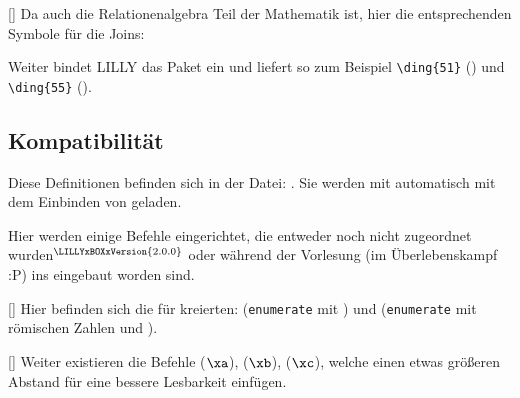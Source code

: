 [\cmdlist {}\cmdlist {}\cmdlist {}]
Da auch die Relationenalgebra Teil der Mathematik ist, hier die entsprechenden Symbole für die Joins:
%
%
%
\begin{bemerkung}
    Weiter bindet LILLY das  Paket ein und liefert so zum Beispiel \verb|\ding{51}| () und \verb|\ding{55}| ().
\end{bemerkung}









\subsection[Kompatibilität \LILLYxBOXxVersion{\small 1.0.3}]{Kompatibilität}
Diese Definitionen befinden sich in der Datei: . Sie werden mit  automatisch mit dem Einbinden von  geladen.\medskip

Hier werden einige Befehle eingerichtet, die entweder noch nicht zugeordnet wurden\({}^{\tiny \LILLYxBOXxVersion{\tiny 2.0.0}}\) oder während der Vorlesung (im Überlebenskampf :P) ins  eingebaut worden sind.

%
%
%

[\cmdlist {}]
Hier befinden sich die für \la kreierten:  (\verb|enumerate| mit \newline{}) und  (\verb|enumerate| mit römischen Zahlen und \newline{}).

%
%
%

[\cmdlist {}\cmdlist {}]
Weiter existieren die Befehle  ($\xa$),  ($\xb$),  ($\xc$), welche einen etwas größeren Abstand für eine bessere Lesbarkeit einfügen.

%
%
%


